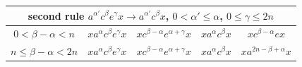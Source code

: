\documentclass{article}
\theoremstyle{definition}
\begin{document}
\begin{center}
\begin{tabular}{|c|c|c|c|c|}
\hline
\multicolumn{5}{|c|}{second rule $a^{\alpha'} c^\beta e^\gamma x  \rightarrow a^{\alpha'} c^\beta x $, $0<\alpha' \le \alpha$, $0 \le \gamma \le 2n$}\\
\hline
$0<\beta-\alpha<n$ &  $ x a^\alpha c^{\beta}  e^\gamma x $ &  $  x  c^{\beta -\alpha} e^{\alpha+\gamma}  x $ &   $   x a^{\alpha} c^\beta  x  $ &  $ x  c^{\beta - \alpha} e x $\\
\hline
$n \le \beta-\alpha<2n$   &  $ x a^\alpha c^{\beta}  e^\gamma x $ &  $  x  c^{\beta -\alpha} e^{\alpha+\gamma}  x $ &   $   x a^{\alpha} c^\beta  x  $ &  $ x a^{2n- \beta + \alpha} x $\\
\hline

\end{tabular}
\end{center}
\end{document}
